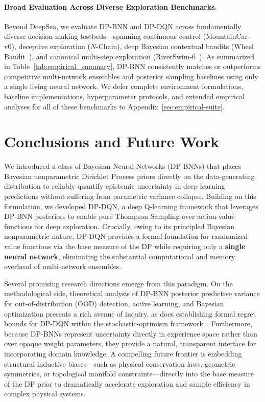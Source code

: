 \documentclass[10pt]{article}
\begin{document}
\paragraph{Broad Evaluation Across Diverse Exploration Benchmarks.}
Beyond DeepSea, we evaluate DP-BNN and DP-DQN across fundamentally diverse decision-making testbeds—spanning continuous control (MountainCar-v0), deceptive exploration ($N$-Chain), deep Bayesian contextual bandits (Wheel Bandit~\citep{riquelme2018deep}), and canonical multi-step exploration (RiverSwim-6~\citep{osband2013more}). As summarized in Table~\ref{tab:empirical_summary}, DP-BNN consistently matches or outperforms competitive multi-network ensembles and posterior sampling baselines using only a single living neural network. We defer complete environment formulations, baseline implementations, hyperparameter protocols, and extended empirical analyses for all of these benchmarks to Appendix~\ref{sec:empirical-suite}.


\section{Conclusions and Future Work}
\label{sec:conclusions}

We introduced a class of Bayesian Neural Networks (DP-BNNs) that places Bayesian nonparametric Dirichlet Process priors directly on the data-generating distribution to reliably quantify epistemic uncertainty in deep learning predictions without suffering from parametric variance collapse. Building on this formulation, we developed DP-DQN, a deep Q-learning framework that leverages DP-BNN posteriors to enable pure Thompson Sampling over action-value functions for deep exploration. Crucially, owing to its principled Bayesian nonparametric nature, DP-DQN provides a formal foundation for randomized value functions via the base measure of the DP while requiring only a \textbf{single neural network}, eliminating the substantial computational and memory overhead of multi-network ensembles.

Several promising research directions emerge from this paradigm. On the methodological side, theoretical analysis of DP-BNN posterior predictive variance for out-of-distribution (OOD) detection, active learning, and Bayesian optimization presents a rich avenue of inquiry, as does establishing formal regret bounds for DP-DQN within the stochastic-optimism framework~\citep{osband2017posterior}. Furthermore, because DP-BNNs represent uncertainty directly in experience space rather than over opaque weight parameters, they provide a natural, transparent interface for incorporating domain knowledge. A compelling future frontier is embedding structural inductive biases—such as physical conservation laws, geometric symmetries, or topological manifold constraints—directly into the base measure of the DP prior to dramatically accelerate exploration and sample efficiency in complex physical systems. 
\end{document}
